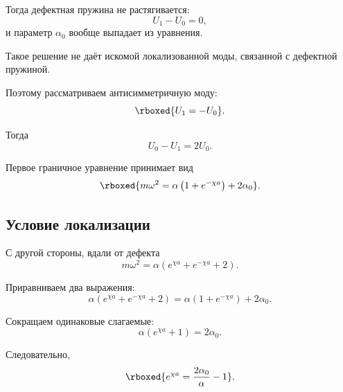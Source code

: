 \documentclass[../final.tex]{subfiles}
\begin{document}
Тогда дефектная пружина не растягивается:
%
\begin{equation*}
    U_1-U_0=0,
\end{equation*}
%
и параметр $\alpha_0$ вообще выпадает из уравнения.

Такое решение не даёт искомой локализованной моды,
связанной с дефектной пружиной.

Поэтому рассматриваем антисимметричную моду:
%
\begin{equation*}
    \rboxed{
        U_1=-U_0
    }.
\end{equation*}

Тогда
%
\begin{equation*}
    U_0-U_1
    =
    2U_0.
\end{equation*}

Первое граничное уравнение принимает вид
%
\begin{equation*}
    \rboxed{
        m\omega^2
        =
        \alpha
        \left(
            1+e^{-\chi a}
        \right)
        +
        2\alpha_0
    }.
\end{equation*}



\subsection*{Условие локализации}

С другой стороны, вдали от дефекта
%
\begin{equation*}
    m\omega^2
    =
    \alpha
    \left(
        e^{\chi a}
        +
        e^{-\chi a}
        +
        2
    \right).
\end{equation*}

Приравниваем два выражения:
%
\begin{equation*}
    \alpha
    \left(
        e^{\chi a}
        +
        e^{-\chi a}
        +
        2
    \right)
    =
    \alpha
    \left(
        1+e^{-\chi a}
    \right)
    +
    2\alpha_0.
\end{equation*}

Сокращаем одинаковые слагаемые:
%
\begin{equation*}
    \alpha
    \left(
        e^{\chi a}+1
    \right)
    =
    2\alpha_0.
\end{equation*}

Следовательно,
%
\begin{equation*}
    \rboxed{
        e^{\chi a}
        =
        \frac{2\alpha_0}{\alpha}-1
    }.
\end{equation*}
\end{document}
